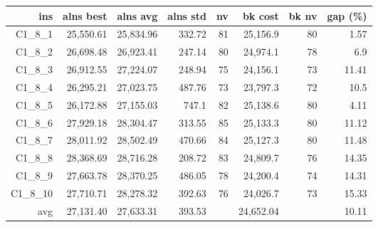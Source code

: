  \begin{table}[caption={Kết quả đo với tập HG\_C\_1\_8 800 yêu cầu}, label=exp:HGC18]
    \small
    \centering
    \begin{tabular}{rrrrrrrr}
    \hline
    ins & alns best & alns avg & alns std & nv & bk cost & bk nv & gap (\%) \\ \hline
    C1\_8\_1 & 25,550.61 & 25,834.96 & 332.72 & 81 & 25,156.9 & 80 & 1.57 \\ \hline
    C1\_8\_2 & 26,698.48 & 26,923.41 & 247.14 & 80 & 24,974.1 & 78 & 6.9 \\ \hline
    C1\_8\_3 & 26,912.55 & 27,224.07 & 248.94 & 75 & 24,156.1 & 73 & 11.41 \\ \hline
    C1\_8\_4 & 26,295.21 & 27,023.75 & 487.76 & 73 & 23,797.3 & 72 & 10.5 \\ \hline
    C1\_8\_5 & 26,172.88 & 27,155.03 & 747.1 & 82 & 25,138.6 & 80 & 4.11 \\ \hline
    C1\_8\_6 & 27,929.18 & 28,304.47 & 313.55 & 85 & 25,133.3 & 80 & 11.12 \\ \hline
    C1\_8\_7 & 28,011.92 & 28,502.49 & 470.66 & 84 & 25,127.3 & 80 & 11.48 \\ \hline
    C1\_8\_8 & 28,368.69 & 28,716.28 & 208.72 & 83 & 24,809.7 & 76 & 14.35 \\ \hline
    C1\_8\_9 & 27,663.78 & 28,370.25 & 486.05 & 78 & 24,200.4 & 74 & 14.31 \\ \hline
    C1\_8\_10 & 27,710.71 & 28,278.32 & 392.63 & 76 & 24,026.7 & 73 & 15.33 \\ \hline
    avg & 27,131.40 & 27,633.31 & 393.53 & & 24,652.04 & & 10.11 \\ \hline
    \end{tabular}
  \end{table}

